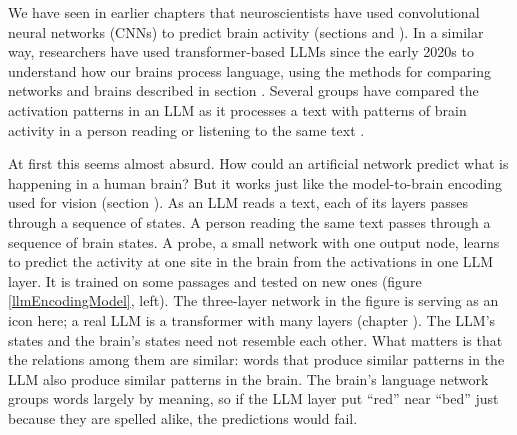 We have seen in earlier chapters that neuroscientists have used convolutional
neural networks (CNNs) to predict brain activity (sections
 and ). In a similar way,
researchers have used transformer-based LLMs since the early 2020s to understand how our
brains process language, using the methods for comparing networks and brains
described in section . Several groups have compared
the activation patterns in an LLM as it processes a text with patterns of brain
activity in a person reading or listening to the same text \cite{pasquiou2022neural,
schrimpf2021neural, caucheteux2022brains}.

At first this seems almost absurd. How could an artificial network predict what
is happening in a human brain? But it works just like the model-to-brain
encoding used for vision (section ). As an LLM reads a
text, each of its layers passes through a sequence of states. A person reading
the same text passes through a sequence of brain states. A probe, a small
network with one output node, learns to predict the activity at one site in the
brain from the activations in one LLM layer. It is trained on some passages and
tested on new ones (figure \ref{llmEncodingModel}, left). The three-layer
network in the figure is serving as an icon here; a real LLM is a transformer
with many layers (chapter ). The LLM's states and
the brain's states need not resemble each other. What matters is that the
relations among them are similar: words that produce similar patterns in the
LLM also produce similar patterns in the brain. The brain's language network groups words largely by meaning, so if the LLM
layer put ``red'' near ``bed'' just because they are spelled alike, the
predictions would fail.

